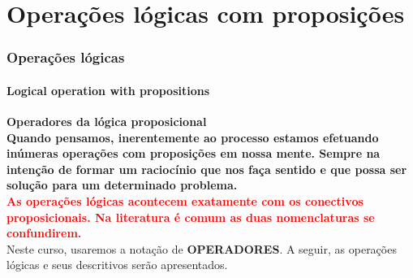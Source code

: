 \documentclass[10pt, headsepline, captions=tableabove,xcolor=table]{beamer}
\begin{document}
\section{Operações lógicas com proposições}
%
\begin{frame}[c]
    \frametitle{Operações lógicas}
    \framesubtitle{Logical operation with propositions}
    \textbf{Operadores da lógica proposicional}\\[2pt]
    \textcolor{green!50!black}{\textbf{Quando pensamos, inerentemente ao processo estamos efetuando inúmeras operações com proposições em nossa mente. Sempre na intenção de formar um raciocínio que nos faça sentido e que possa ser solução para um determinado problema.}}\\[6pt]

    \textcolor{red}{\textbf{As operações lógicas acontecem exatamente com os conectivos proposicionais. Na literatura é comum as duas nomenclaturas se confundirem.}}\\[6pt]
    
    Neste curso, usaremos a notação de \textbf{OPERADORES}. A seguir, as operações lógicas e seus descritivos serão apresentados.

\end{frame}
%
\end{document}

